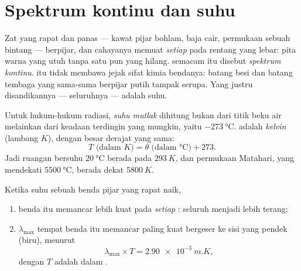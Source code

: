 \section{Spektrum kontinu dan suhu}

\begin{definition}\label{def:g10:light-spectra:continuous}
Zat yang rapat dan panas --- kawat pijar bohlam, baja cair, permukaan
sebuah bintang --- berpijar, dan cahayanya memuat \emph{setiap}  pada rentang yang lebar: pita warna yang utuh tanpa satu pun
yang hilang.  semacam itu disebut \emph{spektrum
kontinu}.  itu tidak membawa jejak
sifat kimia bendanya: batang besi dan batang tembaga yang sama-sama
berpijar putih tampak serupa. Yang justru disandikannya --- seluruhnya
--- adalah suhu.
\end{definition}

\begin{definition}\label{def:g10:light-spectra:kelvin}
Untuk hukum-hukum radiasi, \emph{suhu mutlak}
dihitung bukan dari titik beku air melainkan dari keadaan terdingin
yang mungkin, yaitu $\qty{-273}{\degreeCelsius}$.  adalah
\emph{kelvin} (lambang $\unit{K}$), dengan besar derajat
yang sama:
\[
T \text{ (dalam } \unit{K}) = \theta \text{ (dalam } \unit{\degreeCelsius}) + 273 .
\]
Jadi ruangan bersuhu $\qty{20}{\degreeCelsius}$ berada pada
$\qty{293}{K}$, dan permukaan Matahari, yang mendekati
$\qty{5500}{\degreeCelsius}$, berada dekat $\qty{5800}{K}$.
\end{definition}

\begin{proposition}\label{prop:g10:light-spectra:wien}
Ketika suhu sebuah benda pijar yang rapat naik,
\begin{enumerate}
  \item benda itu memancar lebih kuat pada \emph{setiap} : seluruh  menjadi lebih terang;
  \item {} $\lambda_{\max}$ tempat benda itu memancar
        paling kuat bergeser ke sisi  yang pendek
        (biru), menurut
        \[
        \lambda_{\max} \times T = \qty{2.90e-3}{m.K},
        \]
        dengan $T$ adalah  dalam .
\end{enumerate}
\end{proposition}
\admitted

